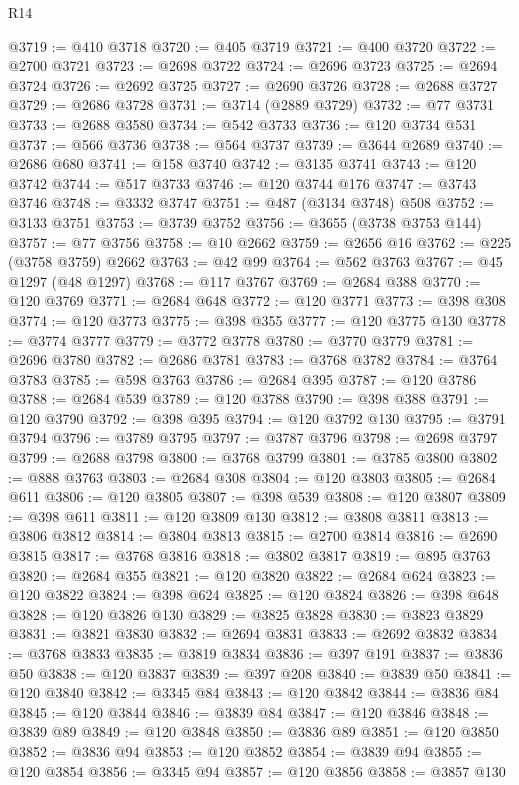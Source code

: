 \begin{lexlean}{R14}
\begin{coremodule}
@3719 := @410 @3718
@3720 := @405 @3719
@3721 := @400 @3720
@3722 := @2700 @3721
@3723 := @2698 @3722
@3724 := @2696 @3723
@3725 := @2694 @3724
@3726 := @2692 @3725
@3727 := @2690 @3726
@3728 := @2688 @3727
@3729 := @2686 @3728
@3731 := @3714 (@2889 @3729)
@3732 := @77 @3731
@3733 := @2688 @3580
@3734 := @542 @3733
@3736 := @120 @3734 @531
@3737 := @566 @3736
@3738 := @564 @3737
@3739 := @3644 @2689
@3740 := @2686 @680
@3741 := @158 @3740
@3742 := @3135 @3741
@3743 := @120 @3742
@3744 := @517 @3733
@3746 := @120 @3744 @176
@3747 := @3743 @3746
@3748 := @3332 @3747
@3751 := @487 (@3134 @3748) @508
@3752 := @3133 @3751
@3753 := @3739 @3752
@3756 := @3655 (@3738 @3753 @144)
@3757 := @77 @3756
@3758 := @10 @2662
@3759 := @2656 @16
@3762 := @225 (@3758 @3759) @2662
@3763 := @42 @99
@3764 := @562 @3763
@3767 := @45 @1297 (@48 @1297)
@3768 := @117 @3767
@3769 := @2684 @388
@3770 := @120 @3769
@3771 := @2684 @648
@3772 := @120 @3771
@3773 := @398 @308
@3774 := @120 @3773
@3775 := @398 @355
@3777 := @120 @3775 @130
@3778 := @3774 @3777
@3779 := @3772 @3778
@3780 := @3770 @3779
@3781 := @2696 @3780
@3782 := @2686 @3781
@3783 := @3768 @3782
@3784 := @3764 @3783
@3785 := @598 @3763
@3786 := @2684 @395
@3787 := @120 @3786
@3788 := @2684 @539
@3789 := @120 @3788
@3790 := @398 @388
@3791 := @120 @3790
@3792 := @398 @395
@3794 := @120 @3792 @130
@3795 := @3791 @3794
@3796 := @3789 @3795
@3797 := @3787 @3796
@3798 := @2698 @3797
@3799 := @2688 @3798
@3800 := @3768 @3799
@3801 := @3785 @3800
@3802 := @888 @3763
@3803 := @2684 @308
@3804 := @120 @3803
@3805 := @2684 @611
@3806 := @120 @3805
@3807 := @398 @539
@3808 := @120 @3807
@3809 := @398 @611
@3811 := @120 @3809 @130
@3812 := @3808 @3811
@3813 := @3806 @3812
@3814 := @3804 @3813
@3815 := @2700 @3814
@3816 := @2690 @3815
@3817 := @3768 @3816
@3818 := @3802 @3817
@3819 := @895 @3763
@3820 := @2684 @355
@3821 := @120 @3820
@3822 := @2684 @624
@3823 := @120 @3822
@3824 := @398 @624
@3825 := @120 @3824
@3826 := @398 @648
@3828 := @120 @3826 @130
@3829 := @3825 @3828
@3830 := @3823 @3829
@3831 := @3821 @3830
@3832 := @2694 @3831
@3833 := @2692 @3832
@3834 := @3768 @3833
@3835 := @3819 @3834
@3836 := @397 @191
@3837 := @3836 @50
@3838 := @120 @3837
@3839 := @397 @208
@3840 := @3839 @50
@3841 := @120 @3840
@3842 := @3345 @84
@3843 := @120 @3842
@3844 := @3836 @84
@3845 := @120 @3844
@3846 := @3839 @84
@3847 := @120 @3846
@3848 := @3839 @89
@3849 := @120 @3848
@3850 := @3836 @89
@3851 := @120 @3850
@3852 := @3836 @94
@3853 := @120 @3852
@3854 := @3839 @94
@3855 := @120 @3854
@3856 := @3345 @94
@3857 := @120 @3856
@3858 := @3857 @130

\end{coremodule}
\end{lexlean}

